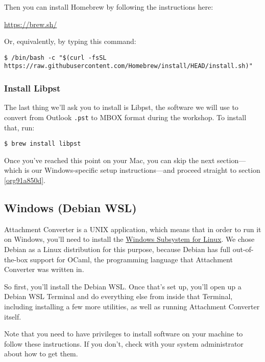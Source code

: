 \documentclass[11pt]{article}
\begin{document}
Then you can install Homebrew by following the instructions here:

\url{https://brew.sh/}

Or, equivalently, by typing this command:

\footnotesize

\begin{verbatim}
$ /bin/bash -c "$(curl -fsSL https://raw.githubusercontent.com/Homebrew/install/HEAD/install.sh)"
\end{verbatim}

\normalsize

\subsubsection{Install Libpst}
\label{sec:org0576f97}

The last thing we'll ask you to install is Libpst, the software we
will use to convert from Outlook \texttt{.pst} to MBOX format during the
workshop.  To install that, run:

\begin{verbatim}
$ brew install libpst
\end{verbatim}

Once you've reached this point on your Mac, you can skip the next
section---which is our Windows-specific setup instructions---and
proceed straight to section \ref{org91a850d}.

\subsection{Windows (Debian WSL) \label{orgd38505a}}
\label{sec:orgb62f2ea}

Attachment Converter is a UNIX application, which means that in order
to run it on Windows, you'll need to install the \href{https://en.wikipedia.org/wiki/Windows\_Subsystem\_for\_Linux}{Windows Subsystem for
Linux}.  We chose Debian as a Linux distribution for this purpose,
because Debian has full out-of-the-box support for OCaml, the
programming language that Attachment Converter was written in.

So first, you'll install the Debian WSL.  Once that's set up, you'll
open up a Debian WSL Terminal and do everything else from inside that
Terminal, including installing a few more utilities, as well as
running Attachment Converter itself.

Note that you need to have privileges to install software on your
machine to follow these instructions.  If you don't, check with your
system administrator about how to get them.
\end{document}
